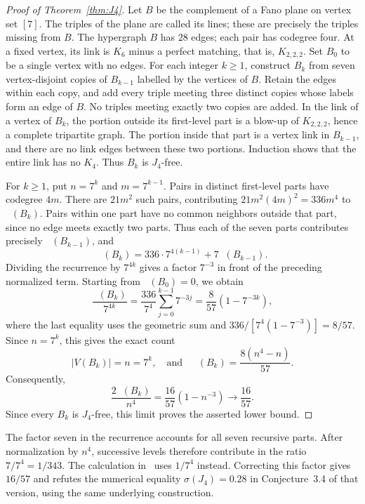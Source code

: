 \documentclass[11pt]{article}
\theoremstyle{remark}
\numberwithin{equation}{section}
\DeclareMathOperator{\co}{co_2}
\begin{document}
\begin{proof}[Proof of Theorem~\ref{thm:J4}]
Let $B$ be the complement of a Fano plane on vertex set $[7]$.
The triples of the plane are called its lines; these are precisely
the triples missing from $B$. The hypergraph $B$ has
$28$ edges; each pair has codegree four. At a fixed vertex, its link
is $K_6$ minus a perfect matching, that is, $K_{2,2,2}$.
Set $B_0$ to be a single vertex with no edges. For each integer $k\ge1$,
construct $B_k$ from seven vertex-disjoint copies of $B_{k-1}$ labelled
by the vertices of $B$. Retain the edges within each copy, and add every
triple meeting three distinct copies whose labels form an edge of $B$.
No triples meeting exactly two copies are added.
In the link of a vertex of $B_k$, the portion outside its
first-level part is a blow-up of $K_{2,2,2}$, hence a complete
tripartite graph. The portion inside
that part is a vertex link in $B_{k-1}$, and there are no link edges
between these two portions. Induction shows that the entire link has
no $K_4$. Thus $B_k$ is $J_4$-free.

For $k\ge1$, put $n=7^k$ and $m=7^{k-1}$. Pairs in distinct first-level parts
have codegree $4m$. There are $21m^2$ such pairs, contributing
$21m^2(4m)^2=336m^4$ to $\co(B_k)$.
Pairs within one part have no common neighbors outside that part,
since no edge meets exactly two parts. Thus each of the seven parts
contributes precisely $\co(B_{k-1})$, and
\[
 \co(B_k)=336\cdot7^{4(k-1)}+7\co(B_{k-1}).
\]
Dividing the recurrence by $7^{4k}$ gives a factor $7^{-3}$ in front
of the preceding normalized term. Starting from $\co(B_0)=0$, we obtain
\[
 \frac{\co(B_k)}{7^{4k}}
 =\frac{336}{7^4}\sum_{j=0}^{k-1}7^{-3j}
 =\frac8{57}(1-7^{-3k}),
\]
where the last equality uses the geometric sum and
$336/[7^4(1-7^{-3})]=8/57$. Since $n=7^k$, this gives the exact count
\begin{equation}\label{eq:J4finite}
 |V(B_k)|=n=7^k,\quad
 \text{and}\quad \co(B_k)=\frac{8(n^4-n)}{57}.
\end{equation}
Consequently,
\[
 \frac{2\co(B_k)}{n^4}=\frac{16}{57}(1-n^{-3})
 \longrightarrow\frac{16}{57}.
\]
Since every $B_k$ is $J_4$-free, this limit proves the asserted lower bound.
\end{proof}

The factor seven in the recurrence accounts for all seven recursive
parts. After normalization by $n^4$, successive levels therefore
contribute in the ratio $7/7^4=1/343$.
The calculation in~\cite[Section~3.15]{BCL} uses $1/7^4$ instead.
Correcting this factor gives $16/57$ and refutes the numerical equality
$\sigma(J_4)=0.28$ in Conjecture~3.4 of that version, using the same
underlying construction.
\end{document}

